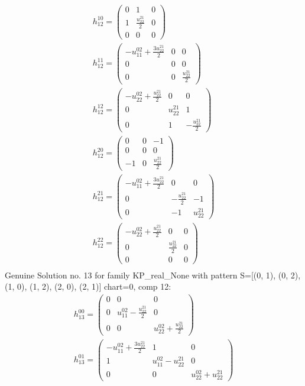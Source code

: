 \documentclass[a4paper, 11pt, twoside, onecolumn]{article}
\begin{document}
\begin{landscape}
\begin{gather*}
	 h_{12}^{10}=\begin{pmatrix}0 & 1 & 0\\1 & \frac{u^{21}_{22}}{2} & 0\\0 & 0 & 0\end{pmatrix}\\ 
	 h_{12}^{11}=\begin{pmatrix}- u^{02}_{11} + \frac{3 u^{21}_{22}}{2} & 0 & 0\\0 & 0 & 0\\0 & 0 & \frac{u^{21}_{22}}{2}\end{pmatrix}\\ 
	 h_{12}^{12}=\begin{pmatrix}- u^{02}_{22} + \frac{u^{21}_{22}}{2} & 0 & 0\\0 & u^{21}_{22} & 1\\0 & 1 & - \frac{u^{21}_{22}}{2}\end{pmatrix}\\ 
	 h_{12}^{20}=\begin{pmatrix}0 & 0 & -1\\0 & 0 & 0\\-1 & 0 & \frac{u^{21}_{22}}{2}\end{pmatrix}\\ 
	 h_{12}^{21}=\begin{pmatrix}- u^{02}_{11} + \frac{3 u^{21}_{22}}{2} & 0 & 0\\0 & - \frac{u^{21}_{22}}{2} & -1\\0 & -1 & u^{21}_{22}\end{pmatrix}\\ 
	 h_{12}^{22}=\begin{pmatrix}- u^{02}_{22} + \frac{u^{21}_{22}}{2} & 0 & 0\\0 & \frac{u^{21}_{22}}{2} & 0\\0 & 0 & 0\end{pmatrix}\\ 
\end{gather*} 
Genuine Solution no. 13 for family KP_real_None with pattern S=[(0, 1), (0, 2), (1, 0), (1, 2), (2, 0), (2, 1)] chart=0, comp 12: 
\begin{gather*} 
	 h_{13}^{00}=\begin{pmatrix}0 & 0 & 0\\0 & u^{02}_{11} - \frac{u^{21}_{22}}{2} & 0\\0 & 0 & u^{02}_{22} + \frac{u^{21}_{22}}{2}\end{pmatrix}\\ 
	 h_{13}^{01}=\begin{pmatrix}- u^{02}_{11} + \frac{3 u^{21}_{22}}{2} & 1 & 0\\1 & u^{02}_{11} - u^{21}_{22} & 0\\0 & 0 & u^{02}_{22} + u^{21}_{22}\end{pmatrix}\\ 

\end{gather*}
\end{landscape}
\end{document}
